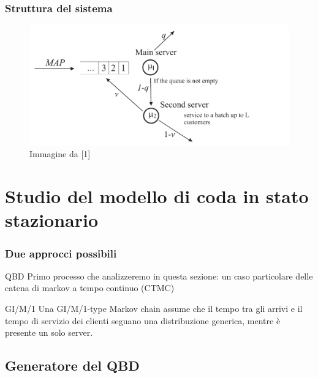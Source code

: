 \documentclass{beamer}
\begin{document}
\begin{frame}
    \frametitle{Struttura del sistema}
    \begin{figure}[h]
        \centering
        \includegraphics[width=\textwidth]{hVQg024.png}
        \caption{Immagine da [1]}
        \label{fig:diagramma_di_stato}
    \end{figure}
\end{frame}


\section{Studio del modello di coda in stato stazionario}


\begin{frame}
    \frametitle{Due approcci possibili}
    \begin{block}{QBD}
        Primo processo che analizzeremo in  questa sezione: un caso particolare delle catena di markov a tempo continuo (CTMC)
    \end{block}
    \begin{block}{GI/M/1}
        Una GI/M/1-type Markov chain assume che il tempo tra gli arrivi e il tempo di servizio dei clienti seguano una distribuzione generica, mentre è presente un solo server.
    \end{block}
\end{frame}


\subsection{Generatore del QBD}


\end{document}
